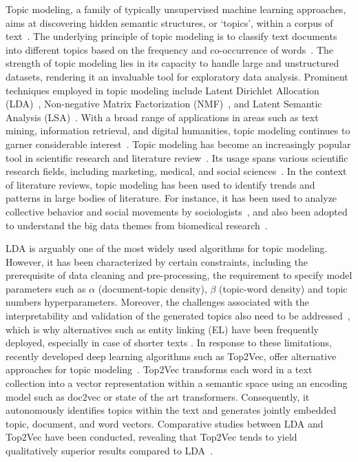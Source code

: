Topic modeling, a family of typically unsupervised machine learning approaches, aims at discovering hidden semantic structures, or `topics', within a corpus of text~\cite{blei2012probabilistic}. The underlying principle of topic modeling is to classify text documents into different topics based on the frequency and co-occurrence of words~\cite{jacobi2018quantitative}. The strength of topic modeling lies in its capacity to handle large and unstructured datasets, rendering it an invaluable tool for exploratory data analysis. Prominent techniques employed in topic modeling include Latent Dirichlet Allocation (LDA)~\cite{blei2003latent}, Non-negative Matrix Factorization (NMF)~\cite{lee1999learning}, and Latent Semantic Analysis (LSA)~\cite{deerwester1990indexing}. With a broad range of applications in areas such as text mining, information retrieval, and digital humanities, topic modeling continues to garner considerable interest~\cite{alghamdi2015survey,yi2009comparative,meeks2012digital}. Topic modeling has become an increasingly popular tool in scientific research and literature review~\cite{asmussen2019smart,amado2018research,chen2019identify}. Its usage spans various scientific research fields, including marketing, medical, and social sciences~\cite{amado2018research,algaa2020analysis,lindstedt2019structural}. In the context of literature reviews, topic modeling has been used to identify trends and patterns in large bodies of literature. For instance, it has been used to analyze collective behavior and social movements by sociologists~\cite{lindstedt2019structural}, and also been adopted to understand the big data themes from biomedical research~\cite{van2016understanding}. 

LDA is arguably one of the most widely used algorithms for topic modeling. However, it has been characterized by certain constraints, including the prerequisite of data cleaning and pre-processing, the requirement to specify model parameters such as $\alpha$ (document-topic density), $\beta$ (topic-word density) and topic numbers hyperparameters. Moreover, the challenges associated with the interpretability and validation of the generated topics also need to be addressed~\cite{maier2018applying,angelov2020top2vec}, which is why alternatives such as entity linking (EL) have been frequently deployed, especially in case of shorter texts \cite{10.1145/3126686.3126776}. In response to these limitations, recently developed deep learning algorithms such as Top2Vec, offer alternative approaches for topic modeling~\cite{angelov2020top2vec}. Top2Vec transforms each word in a text collection into a vector representation within a semantic space using an encoding model such as doc2vec or state of the art transformers. Consequently, it autonomously identifies topics within the text and generates jointly embedded topic, document, and word vectors. Comparative studies between LDA and Top2Vec have been conducted, revealing that Top2Vec tends to yield qualitatively superior results compared to LDA~\cite{egger2022topic,karas2022experiments}.

